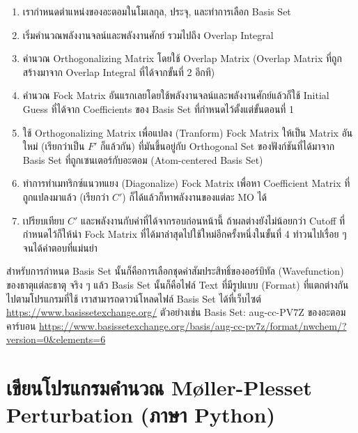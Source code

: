 \begin{enumerate}[topsep=0pt,noitemsep]
  \setlength\itemsep{1em}
  \item เรากำหนดตำแหน่งของอะตอมในโมเลกุล, ประจุ, และทำการเลือก Basis Set

  \item เริ่มคำนวณพลังงานจลน์และพลังงานศักย์ รวมไปถึง Overlap Integral

  \item คำนวณ Orthogonalizing Matrix โดยใช้ Overlap Matrix (Overlap Matrix ที่ถูกสร้างมาจาก Overlap Integral
        ที่ได้จากขั้นที่ 2 อีกที)

  \item คำนวณ Fock Matrix อันแรกเลยโดยใช้พลังงานจลน์และพลังงานศักย์แล้วก็ใช้ Initial Guess ที่ได้จาก Coefficients
        ของ Basis Set ที่กำหนดไว้ตั้งแต่ขั้นตอนที่ 1

  \item ใช้ Orthogonalizing Matrix เพื่อแปลง (Tranform) Fock Matrix ให้เป็น Matrix อันใหม่ (เรียกว่าเป็น $F'$ ก็แล้วกัน)
        ที่มันขึ้นอยู่กับ Orthogonal Set ของฟังก์ชันที่ได้มาจาก Basis Set ที่ถูกเซนเตอร์กับอะตอม (Atom-centered Basis Set)

  \item ทำการทำเมทริกซ์แนวทแยง (Diagonalize) Fock Matrix เพื่อหา Coefficient Matrix ที่ถูกแปลงมาแล้ว (เรียกว่า $C'$)
        ก็ได้แล้วก็หาพลังงานของแต่ละ MO ได้

  \item เปรียบเทียบ $C'$ และพลังงานกับค่าที่ได้จากรอบก่อนหน้านี้ ถ้าผลต่างยังไม่น้อยกว่า Cutoff ที่กำหนดไว้ก็ให้นำ Fock Matrix
        ที่ได้มาล่าสุดไปใช้ใหม่อีกครั้งหนึ่งในขั้นที่ 4 ทำวนไปเรื่อย ๆ จนได้คำตอบที่แม่นยำ
\end{enumerate}

สำหรับการกำหนด Basis Set นั้นก็คือการเลือกชุดค่าสัมประสิทธิ์ของออร์บิทัล (Wavefunction) ของธาตุแต่ละธาตุ จริง ๆ แล้ว Basis Set
นั้นก็คือไฟล์ Text ที่มีรูปแบบ (Format) ที่แตกต่างกันไปตามโปรแกรมที่ใช้ เราสามารถดาวน์โหลดไฟล์ Basis Set ได้ที่เว็บไซต์
\url{https://www.basissetexchange.org/} ตัวอย่างเช่น Basis Set: aug-cc-PV7Z ของอะตอมคาร์บอน
\url{https://www.basissetexchange.org/basis/aug-cc-pv7z/format/nwchem/?version=0&elements=6}

\section{เขียนโปรแกรมคำนวณ M\o{}ller-Plesset Perturbation (ภาษา Python)}

